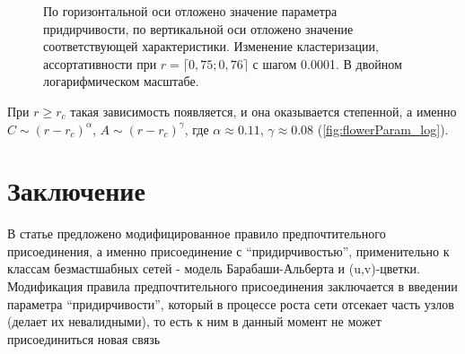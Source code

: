 \documentclass[10pt,aps,pra]{revtex4-1}
\begin{document}
            \begin{figure}[H]  
                \centering

                \caption{
                    \label{fig:flowerParam}
                    По горизонтальной оси отложено значение параметра придирчивости, по вертикальной оси отложено значение соответствующей характеристики.
                     Изменение кластеризации, ассортативности при $r=\lceil 0,75; 0,76 \rceil$ с шагом 0.0001. В двойном логарифмическом масштабе.
                }
            \end{figure}

        При $r \geq r_c$ такая зависимость появляется, и она оказывается степенной, а именно $C \sim {(r-r_c)}^\alpha$, $A \sim {(r-r_c)}^\gamma$, где $\alpha \approx 0.11$, $\gamma \approx 0.08$ (\ref{fig:flowerParam_log}).

\section{Заключение}

    В статье предложено модифицированное правило предпочтительного присоединения, а именно присоединение с ``придирчивостью'', применительно к классам безмастшабных сетей - модель Барабаши-Альберта и (u,v)-цветки. Модификация правила предпочтительного присоединения заключается в введении параметра ``придирчивости'', который в процессе роста сети отсекает часть узлов (делает их невалидными),  то есть к ним в данный момент не может присоединиться новая связь
\end{document}
